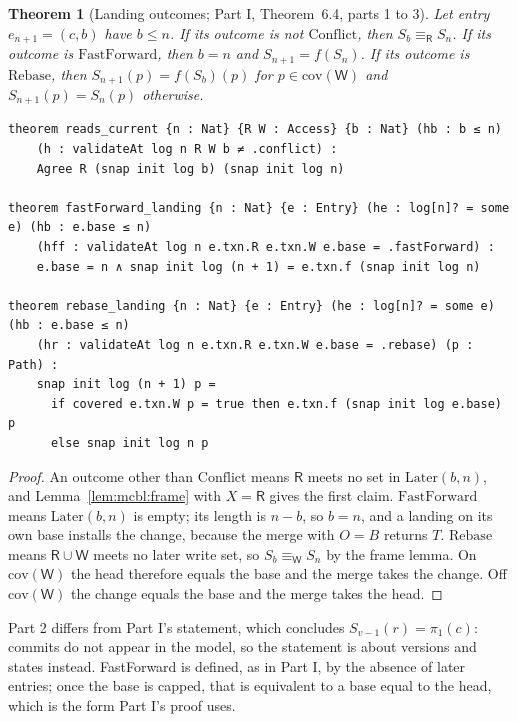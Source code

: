 \documentclass[11pt,letterpaper]{article}
\newtheorem{theorem}{Theorem}[section]
\theoremstyle{definition}
\theoremstyle{remark}
\newcommand{\R}{\mathsf{R}}
\newcommand{\W}{\mathsf{W}}
\newcommand{\Snap}[1]{S_{#1}}
\newcommand{\Later}{\mathrm{Later}}
\newcommand{\fp}{\pi_1}
\newcommand{\op}[1]{\mathrm{#1}}
\newcommand{\covd}{\op{cov}}
\newcommand{\FF}{\mathrm{FastForward}}
\newcommand{\Rb}{\mathrm{Rebase}}
\newcommand{\Cf}{\mathrm{Conflict}}
\begin{document}
\begin{theorem}[Landing outcomes; Part I, Theorem~6.4, parts 1 to 3]
\label{thm:mcbl:outcomes}
Let entry $e_{n+1}=(c,b)$ have $b\leq n$. If its outcome is not $\Cf$, then $\Snap{b}\equiv_{\R}\Snap{n}$. If its outcome is $\FF$, then $b=n$ and $\Snap{n+1}=f(\Snap{n})$. If its outcome is $\Rb$, then $\Snap{n+1}(p)=f(\Snap{b})(p)$ for $p\in\covd(\W)$ and $\Snap{n+1}(p)=\Snap{n}(p)$ otherwise.
\end{theorem}

\begin{lstlisting}[language=Lean,caption={The three parts of Part I, Theorem 6.4 (\texttt{YonedaTx/Serializability.lean})},label={lst:mcbl:thm64}]
theorem reads_current {n : Nat} {R W : Access} {b : Nat} (hb : b ≤ n)
    (h : validateAt log n R W b ≠ .conflict) :
    Agree R (snap init log b) (snap init log n)

theorem fastForward_landing {n : Nat} {e : Entry} (he : log[n]? = some e) (hb : e.base ≤ n)
    (hff : validateAt log n e.txn.R e.txn.W e.base = .fastForward) :
    e.base = n ∧ snap init log (n + 1) = e.txn.f (snap init log n)

theorem rebase_landing {n : Nat} {e : Entry} (he : log[n]? = some e) (hb : e.base ≤ n)
    (hr : validateAt log n e.txn.R e.txn.W e.base = .rebase) (p : Path) :
    snap init log (n + 1) p =
      if covered e.txn.W p = true then e.txn.f (snap init log e.base) p
      else snap init log n p
\end{lstlisting}

\begin{proof}
An outcome other than $\Cf$ means $\R$ meets no set in $\Later(b,n)$, and Lemma~\ref{lem:mcbl:frame} with $X=\R$ gives the first claim. $\FF$ means $\Later(b,n)$ is empty; its length is $n-b$, so $b=n$, and a landing on its own base installs the change, because the merge with $O=B$ returns $T$. $\Rb$ means $\R\cup\W$ meets no later write set, so $\Snap{b}\equiv_\W\Snap{n}$ by the frame lemma. On $\covd(\W)$ the head therefore equals the base and the merge takes the change. Off $\covd(\W)$ the change equals the base and the merge takes the head.
\end{proof}

Part 2 differs from Part I's statement, which concludes $\Snap{v-1}(r)=\fp(c)$: commits do not appear in the model, so the statement is about versions and states instead. FastForward is defined, as in Part I, by the absence of later entries; once the base is capped, that is equivalent to a base equal to the head, which is the form Part I's proof uses.
\end{document}
